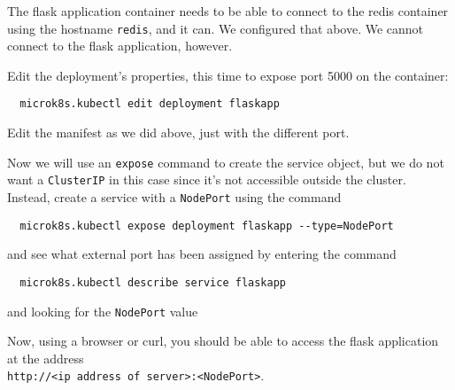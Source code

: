 \documentclass{article}
\begin{document}
The flask application container needs to be able to connect to the redis container using the hostname \texttt{redis}, and it can. We configured that above. We cannot connect to the flask application, however.

Edit the deployment's properties, this time to expose port 5000 on the container:
\begin{verbatim}
  microk8s.kubectl edit deployment flaskapp
\end{verbatim}

Edit the manifest as we did above, just with the different port.

Now we will use an \texttt{expose} command to create the service object, but we do not want a \texttt{ClusterIP} in this case since it's not accessible outside the cluster. Instead, create a service with a \texttt{NodePort} using the command
\begin{verbatim}
  microk8s.kubectl expose deployment flaskapp --type=NodePort
\end{verbatim}

and see what external port has been assigned by entering the command
\begin{verbatim}
  microk8s.kubectl describe service flaskapp 
\end{verbatim}

and looking for the \texttt{NodePort} value

Now, using a browser or curl, you should be able to access the flask application at the address \\
\texttt{http://<ip address of server>:<NodePort>}. 
\end{document}
